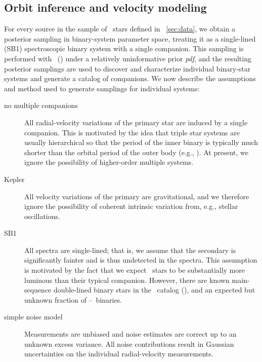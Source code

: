 \documentclass[modern, letterpaper]{aastex62}
\newcommand{\apogee}{\project{\acronym{APOGEE}}}
\newcommand{\thejoker}{\project{The~Joker}}
\newcommand{\RGB}{\acronym{RGB}}
\newcommand{\pdf}{\textit{pdf}}
\begin{document}
\subsection{Orbit inference and velocity modeling}
\label{sec:fitting}

For every source in the sample of \apogee\ stars defined in
\sectionname~\ref{sec:data}, we obtain a posterior sampling in binary-system
parameter space, treating it as a single-lined (SB1) spectroscopic binary system
with a single companion.
This sampling is performed with \thejoker\ (\citealt{Price-Whelan:2017}) under a
relatively uninformative prior \pdf, and the resulting posterior samplings are
used to discover and characterize individual binary-star systems and generate a
catalog of companions.
We now describe the assumptions and method used to generate samplings for
individual systems:
\begin{description}
\item[no multiple companions] All radial-velocity variations of the primary
  star are induced by a single companion.
  This is motivated by the idea that triple star systems are usually
  hierarchical so that the period of the inner binary is typically much shorter
  than the orbital period of the outer body (e.g., \citealt{Tokovinin:2018}).
  At present, we ignore the possibility of higher-order multiple systems.
\item[Kepler] All velocity variations of the primary
  are gravitational, and we therefore ignore the possibility of coherent
  intrinsic variation from, e.g., stellar oscillations.
\item[SB1] All spectra are single-lined; that is, we assume that the secondary
  is significantly fainter and is thus undetected in the spectra.
  This assumption is motivated by the fact that we expect \RGB\ stars to be
  substantially more luminous than their typical companion.
  However, there are known main-sequence double-lined binary stars in the
  \apogee\ catalog (\citealt{El-Badry:2018}), and an expected but unknown
  fraction of \RGB--\RGB\ binaries.
\item[simple noise model] Measurements are unbiased and noise estimates are
  correct up to an unknown excess variance.
  All noise contributions result in Gaussian uncertainties on the individual
  radial-velocity measurements.
\end{description}
\end{document}

